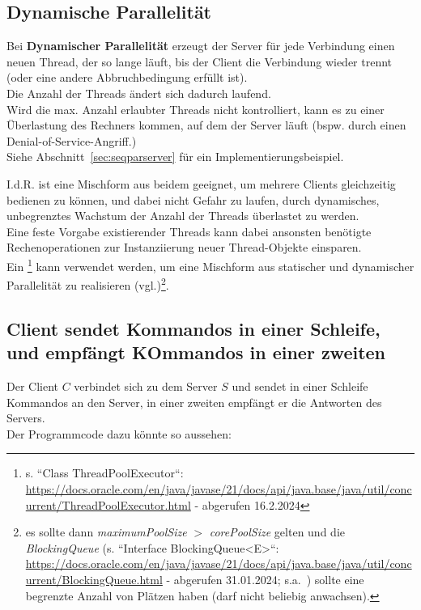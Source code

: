 \subsection*{Dynamische Parallelität}

Bei \textbf{Dynamischer Parallelität} erzeugt der Server für jede Verbindung einen neuen Thread, der so lange läuft, bis der Client die Verbindung wieder trennt (oder eine andere Abbruchbedingung erfüllt ist).\\
Die Anzahl der Threads ändert sich dadurch laufend.\\
Wird die max. Anzahl erlaubter Threads nicht kontrolliert, kann es zu einer Überlastung des Rechners kommen, auf dem der Server läuft (bspw. durch einen Denial-of-Service-Angriff.)\\
Siehe Abschnitt~\ref{sec:seqparserver} für ein Implementierungsbeispiel.

\noindent
I.d.R. ist eine Mischform aus beidem geeignet, um mehrere Clients gleichzeitig bedienen zu können, und dabei nicht Gefahr zu laufen, durch dynamisches, unbegrenztes Wachstum der Anzahl der Threads überlastet zu werden.\\
Eine feste Vorgabe existierender Threads kann dabei ansonsten benötigte Rechenoperationen zur Instanziierung neuer Thread-Objekte
einsparen.\\
Ein \footnote{
    s. ``Class ThreadPoolExecutor``: \url{https://docs.oracle.com/en/java/javase/21/docs/api/java.base/java/util/concurrent/ThreadPoolExecutor.html} - abgerufen 16.2.2024
} kann verwendet werden, um eine Mischform aus statischer und dynamischer Parallelität zu realisieren (vgl.\cite[164 u. 302]{Oec22})\footnote{
    es sollte dann \textit{maximumPoolSize} $>$ \textit{corePoolSize} gelten und die \textit{BlockingQueue} (s. ``Interface BlockingQueue<E>``: \url{https://docs.oracle.com/en/java/javase/21/docs/api/java.base/java/util/concurrent/BlockingQueue.html} - abgerufen 31.01.2024; s.a.~\cite[146]{Oec22}) sollte eine begrenzte Anzahl von Plätzen haben (darf nicht beliebig anwachsen).
}.

\subsection*{Client sendet Kommandos in einer Schleife, und empfängt KOmmandos in einer zweiten}

Der Client $C$ verbindet sich zu dem Server $S$ und sendet in einer Schleife Kommandos an den Server, in einer zweiten
empfängt er die Antworten des Servers.\\
Der Programmcode dazu könnte so aussehen:

